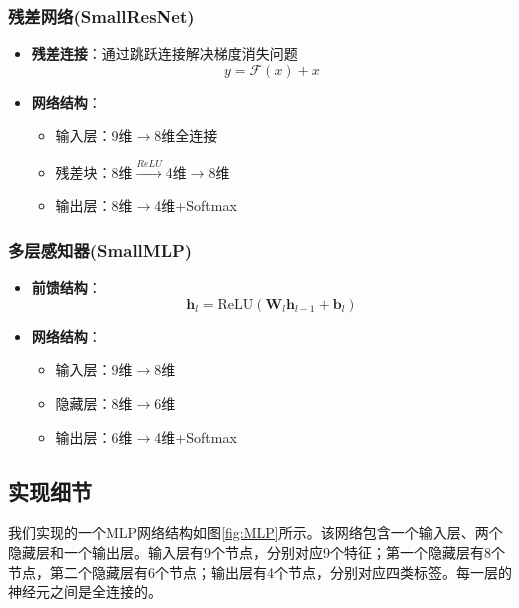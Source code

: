\documentclass[10pt,a4paper,twoside]{article}
\numberwithin{figure}{section}%
\numberwithin{table}{section}%
\begin{document}
\subsubsection{残差网络(SmallResNet)}
\begin{itemize}
    \item \textbf{残差连接}：通过跳跃连接解决梯度消失问题
    \begin{equation}
        y = \mathcal{F}(x) + x
    \end{equation}
    
    \item \textbf{网络结构}：
    \begin{itemize}
        \item 输入层：9维$\rightarrow$8维全连接
        \item 残差块：8维$\xrightarrow{ReLU}$4维$\rightarrow$8维
        \item 输出层：8维$\rightarrow$4维+Softmax
    \end{itemize}
    
\end{itemize}

\subsubsection{多层感知器(SmallMLP)} 
\begin{itemize}
    \item \textbf{前馈结构}：
    \begin{equation}
        \mathbf{h}_l = \text{ReLU}(\mathbf{W}_l\mathbf{h}_{l-1} + \mathbf{b}_l)
    \end{equation}
    
    \item \textbf{网络结构}：
    \begin{itemize}
        \item 输入层：9维$\rightarrow$8维
        \item 隐藏层：8维$\rightarrow$6维
        \item 输出层：6维$\rightarrow$4维+Softmax
    \end{itemize}

\end{itemize}

\subsection{实现细节}

我们实现的一个MLP网络结构如图\ref{fig:MLP}所示。该网络包含一个输入层、两个隐藏层和一个输出层。输入层有9个节点，分别对应9个特征；第一个隐藏层有8个节点，第二个隐藏层有6个节点；输出层有4个节点，分别对应四类标签。每一层的神经元之间是全连接的。
\end{document}
